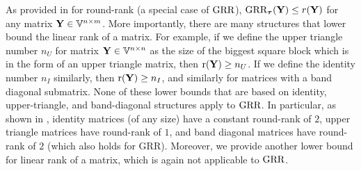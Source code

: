 \documentclass{article}
\newcommand{\sameer}[1]{\todo[color=blue!20]{\textbf{s:} #1}{}}
\begin{document}
As provided in \citet{neumann2015some} for round-rank (a special case of $\text{GRR}$), $\text{GRR}_{{\boldsymbol{\tau}}}(\mathbf{Y})\leq r(\mathbf{Y})$ for any matrix $\mathbf{Y}\in\mathbb{V}^{n\times m}$. 
More importantly, there are many structures that lower bound the linear rank of a matrix.
For example, if we define the upper triangle number $n_U$ for matrix $\mathbf{Y}\in \mathbb{V}^{n\times n}$ as the size of the biggest square block which is in the form of an upper triangle matrix, then $
\mathrm{r}(\mathbf{Y})\geq n_U
$. %
If we define the identity number $n_I$ similarly, then
$
\mathrm{r}(\mathbf{Y})\geq n_I
$, %
and similarly for matrices with a band diagonal submatrix. 
None of these lower bounds that are based on identity, upper-triangle, and band-diagonal structures apply to $\text{GRR}$. 
In particular, as shown in \citet{neumann2015some}, identity matrices (of any size) have a constant round-rank of $2$, upper triangle matrices have round-rank of $1$, and band diagonal matrices have round-rank of $2$ (which also holds for GRR). 
Moreover, we provide another lower bound for linear rank of a matrix, which is again not applicable to $\text{GRR}$.   
\end{document}
